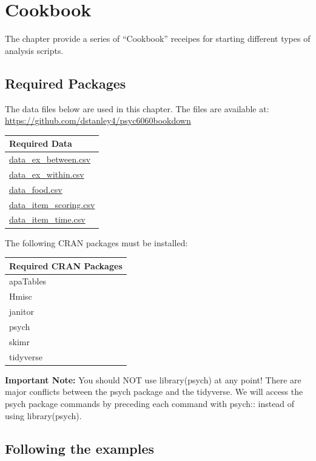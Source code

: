 \documentclass[
]{krantz}
\begin{document}
\hypertarget{cookbook}{%
\chapter{Cookbook}\label{cookbook}}

The chapter provide a series of ``Cookbook'' receipes for starting different types of analysis scripts.

\hypertarget{required-packages-1}{%
\section{Required Packages}\label{required-packages-1}}

The data files below are used in this chapter. The files are available at: \url{https://github.com/dstanley4/psyc6060bookdown}

\begin{longtable}[]{@{}l@{}}
\toprule
Required Data \\
\midrule
\endhead
\url{data_ex_between.csv} \\
\url{data_ex_within.csv} \\
\url{data_food.csv} \\
\url{data_item_scoring.csv} \\
\url{data_item_time.csv} \\
\bottomrule
\end{longtable}

The following CRAN packages must be installed:

\begin{longtable}[]{@{}l@{}}
\toprule
Required CRAN Packages \\
\midrule
\endhead
apaTables \\
Hmisc \\
janitor \\
psych \\
skimr \\
tidyverse \\
\bottomrule
\end{longtable}

\textbf{Important Note:} You should NOT use library(psych) at any point! There are major conflicts between the psych package and the tidyverse. We will access the psych package commands by preceding each command with psych:: instead of using library(psych).

\hypertarget{following-the-examples}{%
\section{Following the examples}\label{following-the-examples}}
\end{document}
